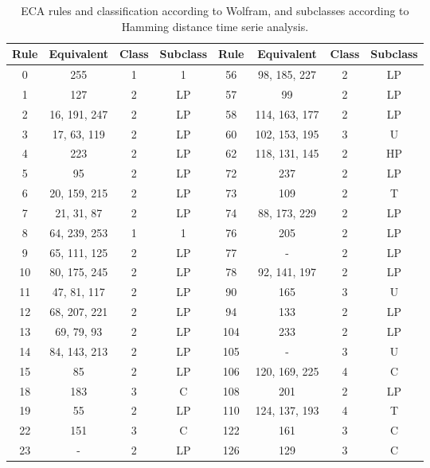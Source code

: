 \setlength{\tabcolsep}{10pt}
\setlength{\tabcolsep}{10pt}
\begin{table} 
\footnotesize
    \caption{ECA rules and classification according to Wolfram, and subclasses according to Hamming distance time serie analysis.}
    \label{tab:ECAclasses}
    \begin{tabular}{c|c|c|c||c|c|c|c}
        
 Rule & Equivalent & Class & Subclass &   Rule & Equivalent & Class & Subclass \\
        \hline
        0 & 255 & 1 & 1  &               56 & 98, 185, 227 & 2 & LP \\
        1 & 127 & 2 & LP  &              57 & 99 & 2 & LP \\
        2 & 16, 191, 247 & 2 & LP  &     58 & 114, 163, 177 & 2 & LP \\
        3 & 17, 63, 119 & 2 & LP  &      60 & 102, 153, 195 & 3 & U \\
        4 & 223 & 2 & LP  &              62 & 118, 131, 145 & 2 & HP \\
        5 & 95 & 2 & LP  &               72 & 237 & 2 & LP \\
        6 & 20, 159, 215 & 2 & LP &      73 & 109 & 2 & T \\
        7 & 21, 31, 87 & 2 & LP &        74 & 88, 173, 229 & 2 & LP \\
        8 & 64, 239, 253 & 1 & 1 &       76 & 205 & 2 & LP \\
        9 & 65, 111, 125 & 2 & LP &      77 & - & 2 & LP \\
        10 & 80, 175, 245  & 2 & LP &    78 & 92, 141, 197 & 2 & LP \\
        11 & 47, 81, 117 & 2 & LP &      90 & 165 & 3 & U \\
        12 & 68, 207, 221 & 2 & LP &     94 & 133 & 2 & LP \\
        13 & 69, 79, 93 & 2 & LP &       104 & 233 & 2 & LP \\
        14 & 84, 143, 213 & 2 & LP &     105 & - & 3 & U \\
        15 & 85 & 2 & LP &               106 & 120, 169, 225 & 4 & C \\
        18 & 183 & 3 & C &               108 & 201 & 2 & LP \\
        19 & 55 & 2 & LP &               110 & 124, 137, 193 & 4 & T \\
        22 & 151 & 3 & C &               122 & 161 & 3 & C \\
        23 & - & 2 & LP &                126 & 129 & 3 & C \\

\end{tabular}
\end{table}
